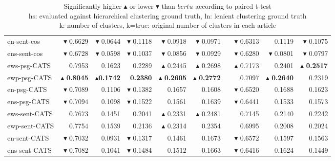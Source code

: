 \begin{small}
\begin{table}[t]
\begin{tabular}{@{}lrrrrrrrrr@{}}
en-sent-cos & $\blacktriangledown$ 0.6629 & $\blacktriangledown$ 0.0644 & $\blacktriangledown$ 0.1118 & $\blacktriangledown$ 0.0918 & $\blacktriangledown$ 0.0971 && $\blacktriangledown$ 0.6313 & 0.1119 & $\blacktriangledown$ 0.1075 \\ 
ens-sent-cos & $\blacktriangledown$ 0.6728 & $\blacktriangledown$ 0.0598 & $\blacktriangledown$ 0.1037 & $\blacktriangledown$ 0.0856 & $\blacktriangledown$ 0.0929 && $\blacktriangledown$ 0.6280 & $\blacktriangledown$ 0.0801 & $\blacktriangledown$ 0.0797 \\\midrule
ews-psg-CATS & 0.7953 & 0.1623 & 0.2289 & $\blacktriangle$ 0.2445 & $\blacktriangle$ 0.2698 && $\blacktriangle$ 0.7173 & 0.2401 & $\blacktriangle$ \textbf{0.2517} \\ 
ewp-psg-CATS & $\blacktriangle$ \textbf{0.8045} & $\blacktriangle$\textbf{0.1742} & \textbf{0.2380} & $\blacktriangle$ \textbf{0.2605} & $\blacktriangle$ \textbf{0.2772} && 0.7097 & $\blacktriangle$ \textbf{0.2640} & 0.2319 \\ 
en-psg-CATS & $\blacktriangledown$ 0.7089 & 0.1106 & $\blacktriangledown$ 0.1382 & 0.1657 & 0.1608 && $\blacktriangledown$ 0.6520 & 0.1688 & 0.1623 \\ 
ens-psg-CATS & $\blacktriangledown$ 0.7094 & 0.1098 & $\blacktriangledown$ 0.1522 & 0.1561 & 0.1639 && $\blacktriangledown$ 0.6441 & 0.1533 & 0.1573 \\\midrule
ews-sent-CATS & 0.7673 & 0.1451 & 0.2041 & $\blacktriangle$ 0.2331 & $\blacktriangle$ 0.2481 && 0.7145 & 0.2140 & 0.2242 \\ 
ewp-sent-CATS & 0.7754 & 0.1539 & 0.2136 & $\blacktriangle$ 0.2314 & 0.2354 && 0.6995 & 0.2008 & 0.2024 \\ 
en-sent-CATS & $\blacktriangledown$ 0.7032 & 0.0931 & $\blacktriangledown$ 0.1317 & 0.1461 & 0.1673 && $\blacktriangledown$ 0.6572 & 0.1597 & 0.1563 \\ 
ens-sent-CATS & $\blacktriangledown$ 0.7082 & 0.1041 & $\blacktriangledown$ 0.1484 & 0.1512 & 0.1663 && $\blacktriangledown$ 0.6416 & 0.1624 & 0.1449 \\ 
\bottomrule
\end{tabular}
\caption*{Significantly higher $\blacktriangle$ or lower $\blacktriangledown$ than $bertu$ according to paired t-test \\
hs: evaluated against hierarchical clustering ground truth, ln: lenient clustering ground truth\\
k: number of clusters, k=true: original number of clusters in each article}
\end{table}
\end{small}

